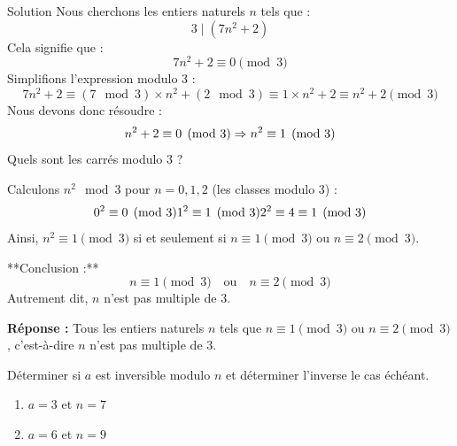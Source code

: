 \documentclass[a4paper,12pt]{article}
\begin{document}
\begin{solutionbox}{Solution}
Nous cherchons les entiers naturels \( n \) tels que :
\[
3 \mid (7n^2 + 2)
\]
Cela signifie que :
\[
7n^2 + 2 \equiv 0 \pmod{3}
\]
Simplifions l'expression modulo 3 :
\[
7n^2 + 2 \equiv (7 \mod 3) \times n^2 + (2 \mod 3) \equiv 1 \times n^2 + 2 \equiv n^2 + 2 \pmod{3}
\]
Nous devons donc résoudre :
\[
n^2 + 2 \equiv 0 \pmod{3} \\
\Rightarrow n^2 \equiv 1 \pmod{3}
\]
Quels sont les carrés modulo 3 ?

Calculons \( n^2 \mod 3 \) pour \( n = 0, 1, 2 \) (les classes modulo 3) :
\[
0^2 \equiv 0 \pmod{3} \\
1^2 \equiv 1 \pmod{3} \\
2^2 \equiv 4 \equiv 1 \pmod{3}
\]
Ainsi, \( n^2 \equiv 1 \pmod{3} \) si et seulement si \( n \equiv 1 \pmod{3} \) ou \( n \equiv 2 \pmod{3} \).

**Conclusion :**
\[
n \equiv 1 \pmod{3} \quad \text{ou} \quad n \equiv 2 \pmod{3}
\]
Autrement dit, \( n \) n'est pas multiple de 3.

\textbf{Réponse :} Tous les entiers naturels \( n \) tels que \( n \equiv 1 \pmod{3} \) ou \( n \equiv 2 \pmod{3} \), c’est-à-dire \( n \) n'est pas multiple de 3.
\end{solutionbox}

\begin{exercice}[title=Exercice 4 $\quad \star \star \quad$ { [Calculer] }]
Déterminer si \( a \) est inversible modulo \( n \) et déterminer l’inverse le cas échéant.
\begin{enumerate}
    \item \( a = 3 \) et \( n = 7 \)
    \item \( a = 6 \) et \( n = 9 \)
\end{enumerate}
\end{exercice}
\end{document}
